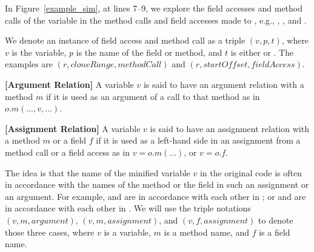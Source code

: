 
In Figure~\ref{example_sim}, at lines 7--9, we explore the
field accesses and method calls of the variable  in the method calls and field accesses made to , e.g.,
, , and .

We denote an instance of field access and method call as a triple $(v,
p, t)$, where $v$ is the variable, $p$ is the name of the field or
method, and $t$ is either  or .
The examples are $(r, cloneRange, methodCall)$ and $(r,
startOffset, fieldAccess)$.




\begin{definition}{\bf [Argument Relation]}
  A variable $v$ is said to have an argument relation with a method
  $m$ if it is used as an argument of a call to that method as in
  $o.m(...,v,...)$.
\end{definition}

\begin{definition}{\bf [Assignment Relation]}
  A variable $v$ is said to have an assignment relation with a method
  $m$ or a field $f$ if it is used as a left-hand side in an
  assignment from a method call or a field access as in $v =
  o.m(...)$, or $v = o.f$.
\end{definition}


%
%

The idea is that the name of the minified variable $v$ in the original
code is often in accordance with the names of the method or the field
in such an assignment or an argument. For example,
 and  are in accordance with each
other in ; or
 and  are in accordance with each other
in .  We will use the triple
notations $(v, m, argument)$, $(v, m, assignment)$, and $(v, f,
assignment)$ to denote those three cases, where $v$ is a variable, $m$
is a method name, and $f$ is a field name.

